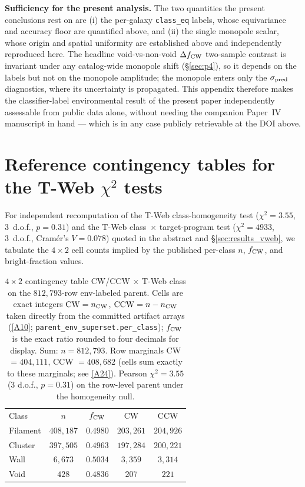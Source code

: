 \documentclass[twocolumn,linenumbers]{aastex702}
\newcommand{\repoBase}{https://github.com/Hubify-Projects/bigbounce/blob/main}
\begin{document}
\textbf{Sufficiency for the present analysis.} The two quantities the
present conclusions rest on are (i) the per-galaxy \texttt{class\_eq}
labels, whose equivariance and accuracy floor are quantified above, and
(ii) the single monopole scalar, whose origin and spatial uniformity are
established above and independently reproduced here. The headline
void-vs-non-void $\Delta f_{\rm CW}$ two-sample contrast is invariant
under any catalog-wide monopole shift (\S\ref{sec:p4}), so it depends on
the labels but not on the monopole amplitude; the monopole enters only
the $\sigma_{\rm pred}$ diagnostics, where its uncertainty is propagated.
This appendix therefore makes the classifier-label environmental result of
the present paper independently assessable from public data alone, without
needing the companion Paper~IV manuscript in hand --- which is in any case
publicly retrievable at the DOI above.

\section{Reference contingency tables for the T-Web $\chi^2$ tests}\label{app:contingency}

For independent recomputation of the T-Web class-homogeneity test
($\chi^2 = 3.55$, 3~d.o.f., $p = 0.31$) and the T-Web class~$\times$
target-program test ($\chi^2 = 4933$, 3~d.o.f., Cram\'er's $V = 0.078$)
quoted in the abstract and \S\ref{sec:results_vweb}, we tabulate
the $4{\times}2$ cell counts implied by the published per-class $n$,
$f_{\rm CW}$, and bright-fraction values.

\begin{table}[!htbp]
\caption{$4{\times}2$ contingency table CW/CCW $\times$ T-Web class on
the $812{,}793$-row env-labeled parent. Cells are exact integers
$\mathrm{CW} = n_{\rm CW}$, $\mathrm{CCW} = n - n_{\rm CW}$ taken
directly from the committed artifact arrays
(\href{\repoBase/pipelines/p5\_desi\_chirality/outputs/17\_v0151\_closure\_recomputes.json}{[A10]};
\texttt{parent\_env\_superset.per\_class}); $f_{\rm CW}$ is the
exact ratio rounded to four decimals for display. Sum: $n = 812{,}793$.
Row marginals CW $= 404{,}111$, CCW $= 408{,}682$ (cells sum exactly to
these marginals; see
\href{\repoBase/pipelines/p5\_desi\_chirality/outputs/31\_ext5\_appendixB\_tables.json}{[A24]}).
Pearson $\chi^2 = 3.55$ ($3$ d.o.f., $p = 0.31$) on the row-level
parent under the homogeneity null.\label{tab:contingency_classCWCCW}}
\begin{ruledtabular}
\begin{tabular}{lcccc}
Class & $n$ & $f_{\rm CW}$ & CW & CCW \\
\colrule
Filament & $408{,}187$ & $0.4980$ & $203{,}261$ & $204{,}926$ \\
Cluster  & $397{,}505$ & $0.4963$ & $197{,}284$ & $200{,}221$ \\
Wall     & $6{,}673$   & $0.5034$ & $3{,}359$   & $3{,}314$   \\
Void     & $428$       & $0.4836$ & $207$       & $221$       \\
\end{tabular}
\end{ruledtabular}
\end{table}
\end{document}
